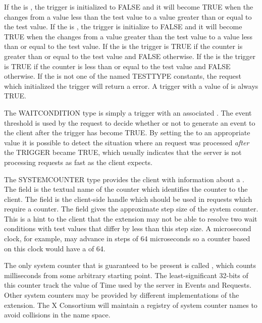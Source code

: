If the  is , the trigger is
initialized to FALSE and it will become TRUE when the  changes
from a value less than the test value to a value greater than or equal to the
test value. If the  is , the
trigger is initialize to FALSE and it will become TRUE when the
 changes from a value greater than the test value to a value
less than or equal to the test value. If the  is
 the trigger is TRUE if the counter is greater than or
equal to the test value and FALSE otherwise.  If the  is
 the trigger is TRUE if the counter is less than or
equal to the test value and FALSE otherwise. If the 
is not one of the named TESTTYPE constants, the request which
initialized the trigger will return a  error.  A trigger
with a  value of  is always TRUE.

The WAITCONDITION type is simply a trigger with an associated
.  The event threshold is used by the 
request to decide whether or not to generate an event to the client after the
trigger has become TRUE. By setting the  to an
appropriate value it is possible to detect the situation where an
 request was processed {\it after} the TRIGGER became TRUE,
which usually indicates that the server is not processing requests as fast as
the client expects.

The SYSTEMCOUNTER type provides the client with information about a
. The  field is the textual name of the
counter which identifies the counter to the client. The  field
is the client-side handle which should be used in requests which require a
counter. The  field gives the approximate step size of the
system counter. This is a hint to the client that the extension may not be
able to resolve two wait conditions with test values that differ by less than
this step size. A microsecond clock, for example, may advance in steps of 64
microseconds so a counter based on this clock would have a 
of 64.

The only system counter that is guaranteed to be present is called
, which counts milliseconds from some arbitrary starting
point. The least-significant 32-bits of this counter track the value of Time
used by the server in Events and Requests. Other system counters may be
provided by different implementations of the extension. The X Consortium will
maintain a registry of system counter names to avoid collisions in the
name space.

